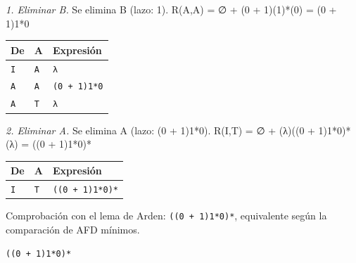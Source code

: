 \documentclass[11pt]{article}
\begin{document}
\textit{1. Eliminar B.} Se elimina B (lazo: 1). R(A,A) = ∅ + (0 + 1)(1)*(0) = (0 + 1)1*0
\begin{center}\footnotesize\begin{tabular}{lll}\toprule
De & A & Expresión \\\midrule
\texttt{I} & \texttt{A} & \texttt{λ} \\
\texttt{A} & \texttt{A} & \texttt{(0 + 1)1*0} \\
\texttt{A} & \texttt{T} & \texttt{λ} \\
\bottomrule\end{tabular}\end{center}
\textit{2. Eliminar A.} Se elimina A (lazo: (0 + 1)1*0). R(I,T) = ∅ + (λ)((0 + 1)1*0)*(λ) = ((0 + 1)1*0)*
\begin{center}\footnotesize\begin{tabular}{lll}\toprule
De & A & Expresión \\\midrule
\texttt{I} & \texttt{T} & \texttt{((0 + 1)1*0)*} \\
\bottomrule\end{tabular}\end{center}
Comprobación con el lema de Arden: \texttt{((0 + 1)1*0)*}, equivalente según la comparación de AFD mínimos.

\resp \texttt{((0 + 1)1*0)*}
\end{document}
